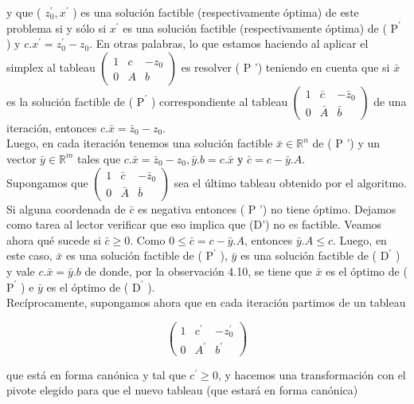 \documentclass[10pt]{article}
\begin{document}
y que ( $z_{0}^{\prime}, x^{\prime}$ ) es una solución factible (respectivamente óptima) de este problema si y sólo si $x^{\prime}$ es una solución factible (respectivamente óptima) de ( $\mathrm{P}^{\prime}$ ) y $c . x^{\prime}=z_{0}^{\prime}-z_{0}$. En otras palabras, lo que estamos haciendo al aplicar el simplex al tableau $\left(\begin{array}{cc|c}1 & c & -z_{0} \\ 0 & A & b\end{array}\right)$ es resolver ( P ') teniendo en cuenta que si $\bar{x}$ es la solución factible de ( $\mathrm{P}^{\prime}$ ) correspondiente al tableau $\left(\begin{array}{cc|c}1 & \bar{c} & -\bar{z}_{0} \\ 0 & \bar{A} & \bar{b}\end{array}\right)$ de una iteración, entonces $c . \bar{x}=\bar{z}_{0}-z_{0}$.\\
Luego, en cada iteración tenemos una solución factible $\bar{x} \in \mathbb{R}^{n}$ de ( P ') y un vector $\bar{y} \in \mathbb{R}^{m}$ tales que $c . \bar{x}=\bar{z}_{0}-z_{0}, \bar{y} . b=c . \bar{x}$ у $\bar{c}=c-\bar{y} . A$.\\
Supongamos que $\left(\begin{array}{cc|c}1 & \bar{c} & -\bar{z}_{0} \\ 0 & \bar{A} & \bar{b}\end{array}\right)$ sea el último tableau obtenido por el algoritmo. Si alguna coordenada de $\bar{c}$ es negativa entonces ( P ') no tiene óptimo. Dejamos como tarea al lector verificar que eso implica que (D') no es factible. Veamos ahora qué sucede si $\bar{c} \geq 0$. Como $0 \leq \bar{c}=c-\bar{y} . A$, entonces $\bar{y} . A \leq c$. Luego, en este caso, $\bar{x}$ es una solución factible de ( $\mathrm{P}^{\prime}$ ), $\bar{y}$ es una solución factible de ( $\mathrm{D}^{\prime}$ ) y vale $c . \bar{x}=\bar{y} . b$ de donde, por la observación 4.10, se tiene que $\bar{x}$ es el óptimo de ( $\mathrm{P}^{\prime}$ ) e $\bar{y}$ es el óptimo de ( $\mathrm{D}^{\prime}$ ).\\
Recíprocamente, supongamos ahora que en cada iteración partimos de un tableau

$$
\left(\begin{array}{cc|c}
1 & c^{\prime} & -z_{0}^{\prime} \\
0 & A^{\prime} & b^{\prime}
\end{array}\right)
$$

que está en forma canónica y tal que $c^{\prime} \geq 0$, y hacemos una transformación con el pivote elegido para que el nuevo tableau (que estará en forma canónica)
\end{document}
